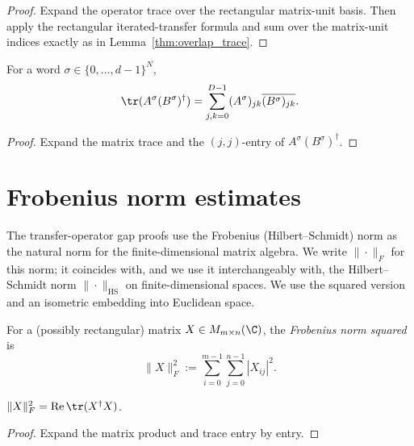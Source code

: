 \begin{proof}\leanok
    Expand the operator trace over the rectangular matrix-unit basis.
    Then apply the rectangular iterated-transfer formula and sum over
    the matrix-unit indices exactly as in
    Lemma~\ref{thm:overlap_trace}.
\end{proof}

\begin{lemma}\label{lem:word_trace_entrywise}
    \leanok
    For a word $\sigma \in \{0,\ldots,d{-}1\}^N$,
    \[
        \tr(A^\sigma (B^\sigma)^\dagger)
        =
        \sum_{j,k = 0}^{D-1}
        (A^\sigma)_{jk} \overline{(B^\sigma)_{jk}}.
    \]
\end{lemma}

\begin{proof}\leanok
    Expand the matrix trace and the $(j,j)$-entry of
    $A^\sigma (B^\sigma)^\dagger$.
\end{proof}

\section{Frobenius norm estimates}

The transfer-operator gap proofs use the Frobenius (Hilbert--Schmidt) norm
as the natural norm for the finite-dimensional matrix algebra.
We write $\|{\cdot}\|_F$ for this norm; it coincides with, and we use it
interchangeably with, the Hilbert--Schmidt norm $\|{\cdot}\|_{\mathrm{HS}}$ on finite-dimensional spaces.
We use the squared version and an isometric embedding into
Euclidean space.

\begin{definition}\label{def:frob_sq}
    \leanok
    For a (possibly rectangular) matrix $X \in M_{m \times n}(\C)$,
    the \emph{Frobenius norm squared} is
    \[
        \|X\|_F^2 := \sum_{i=0}^{m-1}\sum_{j=0}^{n-1} |X_{ij}|^2.
    \]
\end{definition}

\begin{lemma}\label{lem:frob_sq_trace}
    \leanok
    $\|X\|_F^2 = \operatorname{Re}\tr(X^\dagger X)$.
\end{lemma}

\begin{proof}\leanok
    Expand the matrix product and trace entry by entry.
\end{proof}

